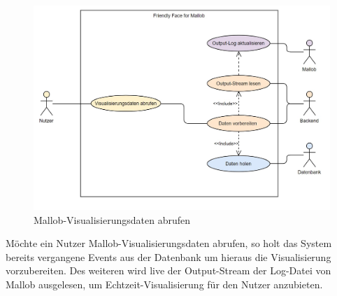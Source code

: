 \begin{figure}[H]
    \centering
    \includegraphics[width=\textwidth]{images-interface/Diagramme/visualisierungsdaten_anwendungsfaelle.jpg}
    \caption{Mallob-Visualisierungsdaten abrufen}
\end{figure}
Möchte ein \gls{Nutzer} Mallob-Visualisierungsdaten abrufen, so holt das System bereits vergangene Events aus der \gls{Datenbank} um hieraus die Visualisierung vorzubereiten. Des weiteren wird live der Output-\gls{Stream} der \gls{Log-Datei} von Mallob ausgelesen, um Echtzeit-Visualisierung für den \gls{Nutzer} anzubieten. 


\pagebreak


